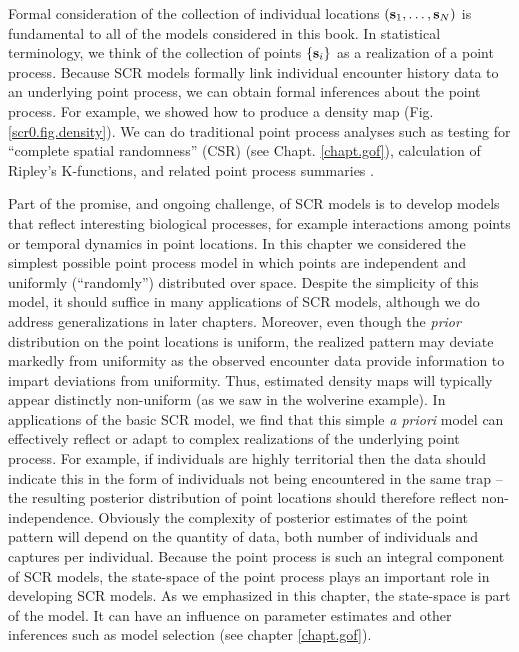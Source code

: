 {Formal consideration of the collection of individual locations $({\bf
  s}_{1}, \ldots, {\bf s}_{N})$  is fundamental to all of
the models considered in this book. In statistical terminology, we
think of the collection of points $\{ {\bf s}_{i} \}$ as a realization of a
point process. 
Because SCR models formally link individual encounter history data to
an underlying point process, we can obtain formal inferences about the
point process. For example, we showed how to produce a density
map (Fig. \ref{scr0.fig.density}). We can do
traditional point process analyses such as testing for
``complete spatial randomness''
(CSR) (see Chapt.  \ref{chapt.gof}),
calculation of Ripley's K-functions,
and related point process summaries \citep{illian_etal:2008}.

Part of the promise, and ongoing challenge, of SCR
models is to develop models that reflect interesting biological
processes, for example interactions among points or temporal dynamics
in point locations.  In this chapter  we considered the simplest possible point
process model in which points are independent and uniformly
(``randomly'') distributed over space. Despite the simplicity of this
model, it should suffice in many applications of SCR models, 
although we do address generalizations in later
chapters. Moreover, even though the {\it prior} distribution on the
point locations is uniform, the realized pattern may deviate markedly
from uniformity as the observed encounter data provide information to
impart deviations from uniformity. Thus,  estimated density maps
will typically appear distinctly non-uniform (as we saw in the
wolverine example). 
In
applications of the basic SCR model, we find that this simple {\it a priori}
model can effectively reflect or adapt to complex realizations of the
underlying point process.  For example, if individuals are highly
territorial then the data should indicate this in the form of
individuals not being encountered in the same trap -- the resulting
posterior distribution of point locations should therefore reflect
non-independence.  Obviously the complexity of posterior estimates of
the point pattern will depend on the quantity of data, both number of
individuals and captures per individual.  Because the point process is
such an integral component of SCR models, the state-space of the point
process plays an important role in developing SCR models. As we
emphasized in this chapter, the state-space is part of
the model. It can have an influence on parameter estimates and other
inferences such as model selection (see chapter \ref{chapt.gof}).


}
